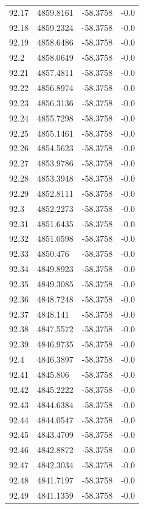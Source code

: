 \begin{table}[H]
\begin{tabular}{llll}
92.17 & 4859.8161 & -58.3758 & -0.0 \\
92.18 & 4859.2324 & -58.3758 & -0.0 \\
92.19 & 4858.6486 & -58.3758 & -0.0 \\
92.2 & 4858.0649 & -58.3758 & -0.0 \\
92.21 & 4857.4811 & -58.3758 & -0.0 \\
92.22 & 4856.8974 & -58.3758 & -0.0 \\
92.23 & 4856.3136 & -58.3758 & -0.0 \\
92.24 & 4855.7298 & -58.3758 & -0.0 \\
92.25 & 4855.1461 & -58.3758 & -0.0 \\
92.26 & 4854.5623 & -58.3758 & -0.0 \\
92.27 & 4853.9786 & -58.3758 & -0.0 \\
92.28 & 4853.3948 & -58.3758 & -0.0 \\
92.29 & 4852.8111 & -58.3758 & -0.0 \\
92.3 & 4852.2273 & -58.3758 & -0.0 \\
92.31 & 4851.6435 & -58.3758 & -0.0 \\
92.32 & 4851.0598 & -58.3758 & -0.0 \\
92.33 & 4850.476 & -58.3758 & -0.0 \\
92.34 & 4849.8923 & -58.3758 & -0.0 \\
92.35 & 4849.3085 & -58.3758 & -0.0 \\
92.36 & 4848.7248 & -58.3758 & -0.0 \\
92.37 & 4848.141 & -58.3758 & -0.0 \\
92.38 & 4847.5572 & -58.3758 & -0.0 \\
92.39 & 4846.9735 & -58.3758 & -0.0 \\
92.4 & 4846.3897 & -58.3758 & -0.0 \\
92.41 & 4845.806 & -58.3758 & -0.0 \\
92.42 & 4845.2222 & -58.3758 & -0.0 \\
92.43 & 4844.6384 & -58.3758 & -0.0 \\
92.44 & 4844.0547 & -58.3758 & -0.0 \\
92.45 & 4843.4709 & -58.3758 & -0.0 \\
92.46 & 4842.8872 & -58.3758 & -0.0 \\
92.47 & 4842.3034 & -58.3758 & -0.0 \\
92.48 & 4841.7197 & -58.3758 & -0.0 \\
92.49 & 4841.1359 & -58.3758 & -0.0 \\

\end{tabular}
\end{table}
